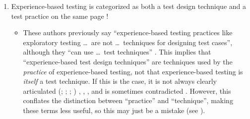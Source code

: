 \begin{enumerate}
    \item Experience-based testing is categorized as both a test design
          technique and a test practice on the same page
          \citep[pp.~22, 34]{IEEE2022}!
          \begin{itemize}
              \item These authors previously say ``experience-based testing
                    practices like exploratory testing \dots\ are not
                    \dots\ techniques for designing test cases'', although
                    they ``can use \dots\ test techniques''
                    \citeyearpar[p.~viii]{IEEE2021}. This implies that
                    ``experience-based test design techniques'' are
                    techniques used by the \emph{practice} of experience-based
                    testing, not that experience-based testing is
                    \emph{itself} a test technique. If this is the case, it
                    is not always clearly articulated
                    \ifnotpaper
                        (\citealp[pp.~4,~22]{IEEE2022}; \citeyear[p.~4]{IEEE2021};
                        \citealp[p.~5-13]{SWEBOK2024}; \citealpISTQB{})
                    \else
                        \cite[pp.~4,~22]{IEEE2022}, \cite[p.~4]{IEEE2021},
                        \cite[p.~5-13]{SWEBOK2024}, \cite{ISTQB}
                    \fi
                    and is
                    sometimes contradicted \citep[p.~46]{Firesmith2015}.
                    However, this conflates the distinction between
                    ``practice'' and ``technique'', making these terms less
                    useful, so this may just be a mistake
                    (see ).



\end{itemize}
\end{enumerate}

